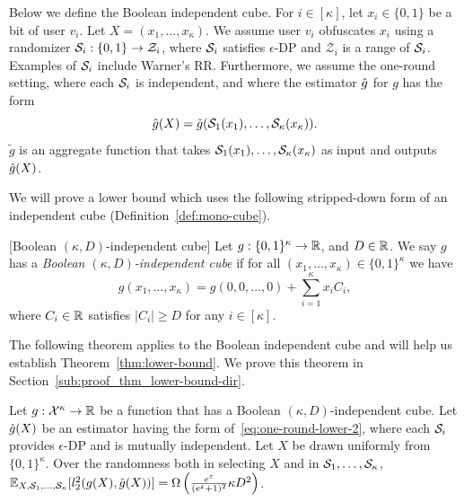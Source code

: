{Below we define the Boolean independent cube. 
For $i\in[\kappa]$, let $x_i \in \{0,1\}$ be a bit of user $v_i$. 
Let $X = (x_1, \ldots, x_\kappa)$. 
We assume user $v_i$ 
obfuscates $x_i$ using 
a randomizer
$\mathcal{S}_i : \{0,1\} \rightarrow \mathcal{Z}_i$, where $\mathcal{S}_i$ 
satisfies $\epsilon$-DP and $\mathcal{Z}_i$ is a range of $\mathcal{S}_i$. 
Examples of $\mathcal{S}_i$ include Warner's RR. 
Furthermore, we assume the one-round setting, where each $\mathcal{S}_i$ is independent, 
and where the estimator $\hat{g}$ for $g$ has the form
\begin{equation}\label{eq:one-round-lower-2}
  \hat{g}(X) = \tilde{g}(\mathcal{S}_1(x_1), \ldots, \mathcal{S}_\kappa(x_\kappa)).
\end{equation}
$\tilde{g}$ is an aggregate function that takes $\mathcal{S}_1(x_1), \ldots, \mathcal{S}_\kappa(x_\kappa)$ as input and outputs $\hat{g}(X)$. 

We will prove a lower bound which uses the following stripped-down form of an independent cube (Definition~\ref{def:mono-cube}).
\begin{definition}\label{def:mono-cube-boolean}[Boolean $(\kappa,D)$-independent cube]
  Let $g : \{0,1\}^\kappa \rightarrow \mathbb{R}$, and $D \in \mathbb{R}$.
  We say 
  $g$ has 
  a \emph{Boolean $(\kappa,D)$-independent cube} 
  if for all
  $(x_1, \ldots, x_\kappa) \in \{0,1\}^\kappa$ we have 
  \[
    g(x_1, \ldots, x_\kappa) = g(0,0,\ldots,0) + \sum_{i=1}^\kappa x_i C_i,
  \]
  where $C_i \in \mathbb{R}$ satisfies $|C_i| \geq D$ for any $i \in [\kappa]$.
\end{definition}

The following theorem applies to 
the Boolean independent cube 
and will help us establish
Theorem~\ref{thm:lower-bound}. We prove this theorem in
Section~\ref{sub:proof_thm_lower-bound-dir}.
\begin{theorem}\label{thm:lower-bound-dir}
  Let $g : \mathcal{X}^{\kappa} \rightarrow \mathbb{R}$ be a function 
  that has 
  a Boolean
  $(\kappa,D)$-independent cube. 
  Let $\hat{g}(X)$ be an estimator having the form
  of~\eqref{eq:one-round-lower-2}, where 
  each $\mathcal{S}_i$ %
  provides $\epsilon$-DP and 
  is 
  mutually 
  independent. 
  Let $X$ be drawn uniformly from
  $\{0,1\}^\kappa$. 
  Over the randomness both in selecting $X$ and in 
  $\mathcal{S}_1, \ldots, \mathcal{S}_\kappa$, 
  $\mathbb{E}_{X, \mathcal{S}_1, \ldots, \mathcal{S}_\kappa}[l_2^2(g(X), \hat{g}(X))] =
  \Omega\left(\frac{e^\varepsilon}{(e^\varepsilon+1)^2} \kappa D^2\right)$.
\end{theorem}

}
